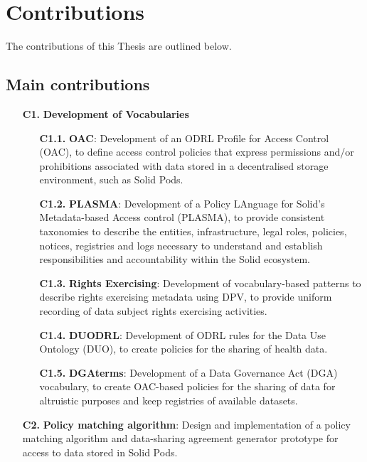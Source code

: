 \section{Contributions}
\label{sec:contributions}

The contributions of this Thesis are outlined below.

\subsection{Main contributions}
\label{sec:contr_main}

\begin{enumerate}
    \item [\textbf{C1.}] \textbf{Development of Vocabularies}
    \begin{enumerate}
        \item [\textbf{C1.1.}] \textbf{OAC}: Development of an ODRL Profile for Access Control (OAC), to define access control policies that express permissions and/or prohibitions associated with data stored in a decentralised storage environment, such as Solid Pods.
        \item [\textbf{C1.2.}] \textbf{PLASMA}: Development of a Policy LAnguage for Solid’s Metadata-based Access control (PLASMA), to provide consistent taxonomies to describe the entities, infrastructure, legal roles, policies, notices, registries and logs necessary to understand and establish responsibilities and accountability within the Solid ecosystem.
        \item [\textbf{C1.3.}] \textbf{Rights Exercising}: Development of vocabulary-based patterns to describe rights exercising metadata using DPV, to provide uniform recording of data subject rights exercising activities.
        \item [\textbf{C1.4.}] \textbf{DUODRL}: Development of ODRL rules for the Data Use Ontology (DUO), to create policies for the sharing of health data.
        \item [\textbf{C1.5.}] \textbf{DGAterms}: Development of a Data Governance Act (DGA) vocabulary, to create OAC-based policies for the sharing of data for altruistic purposes and keep registries of available datasets.
    \end{enumerate}
    \item [\textbf{C2.}] \textbf{Policy matching algorithm}: Design and implementation of a policy matching algorithm and data-sharing agreement generator prototype for access to data stored in Solid Pods.
\end{enumerate}

